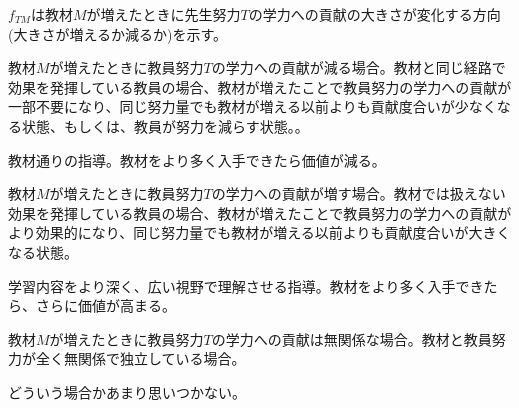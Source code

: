 \begin{frame}[t]{}
$f_{TM}$は教材$M$が増えたときに先生努力$T$の学力への貢献の大きさが変化する方向(大きさが増えるか減るか)を示す。
\begin{description}
\vspace{1.0ex}\setlength{\itemsep}{1.0ex}\setlength{\baselineskip}{12pt}
\pause
\item[代替物substitutes $f_{TM}<0$]	教材$M$が増えたときに教員努力$T$の学力への貢献が減る場合。教材と同じ経路で効果を発揮している教員の場合、教材が増えたことで教員努力の学力への貢献が一部不要になり、同じ努力量でも教材が増える以前よりも貢献度合いが少なくなる状態、もしくは、教員が努力を減らす状態。。
	\begin{dinglist}{43}
	\vspace{1.0ex}\setlength{\itemsep}{1.0ex}\setlength{\baselineskip}{12pt}
\pause
	\item	教材通りの指導。教材をより多く入手できたら価値が減る。
	\end{dinglist}
\pause
\item[補完物complements $f_{TM}>0$]	教材$M$が増えたときに教員努力$T$の学力への貢献が増す場合。教材では扱えない効果を発揮している教員の場合、教材が増えたことで教員努力の学力への貢献がより効果的になり、同じ努力量でも教材が増える以前よりも貢献度合いが大きくなる状態。
	\begin{dinglist}{43}
	\vspace{1.0ex}\setlength{\itemsep}{1.0ex}\setlength{\baselineskip}{12pt}
\pause
	\item	学習内容をより深く、広い視野で理解させる指導。教材をより多く入手できたら、さらに価値が高まる。
	\end{dinglist}
\pause
\item[無関係unrelated $f_{TM}=0$]	教材$M$が増えたときに教員努力$T$の学力への貢献は無関係な場合。教材と教員努力が全く無関係で独立している場合。
	\begin{dinglist}{43}
	\vspace{1.0ex}\setlength{\itemsep}{1.0ex}\setlength{\baselineskip}{12pt}
\pause
	\item	どういう場合かあまり思いつかない。
	\end{dinglist}
\end{description}
\end{frame}

